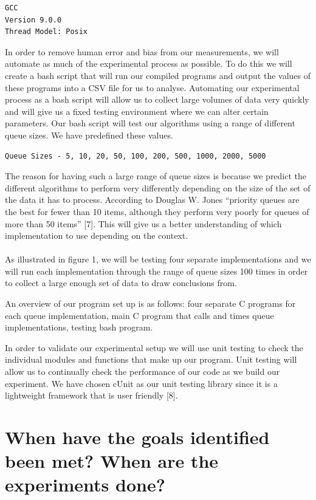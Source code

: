 \documentclass[12pt]{article}
\begin{document}
\begin{verbatim}
GCC
Version 9.0.0
Thread Model: Posix
\end{verbatim}

In order to remove human error and bias from our measurements, we will automate as much of the experimental process as possible. To do this we will create a bash script that will run our compiled programs and output the values of  these programs into a CSV file for us to analyse. Automating our experimental process as a bash script will allow us to collect large volumes of data very quickly and will give us a fixed testing environment where we can alter certain parameters. Our bash script will test our algorithms using a range of different queue sizes. We have predefined these values.

\begin{verbatim}
Queue Sizes - 5, 10, 20, 50, 100, 200, 500, 1000, 2000, 5000
\end{verbatim}

The reason for having such a large range of queue sizes is because we predict the different algorithms to perform very differently depending on the size of the set of the data it has to process. According to Douglas W. Jones “priority queues are the best for fewer than 10 items, although they perform very poorly for queues of more than 50 items” [7]. This will give us a better understanding of which implementation to use depending on the context.
\\
\\
As illustrated in figure 1, we will be testing four separate implementations and we will run each implementation through the range of queue sizes 100 times in order to collect a large enough set of data to draw conclusions from. 

An overview of our program set up is as follows:  four separate C programs for each queue implementation, main C program that calls and times queue implementations, testing bash program.

In order to validate our experimental setup we will use unit testing to check the individual modules and functions that make up our program. Unit testing will allow us to continually check the performance of our code as we build our experiment. We have chosen cUnit as our unit testing library since it is a lightweight framework that is user friendly [8].


\section{When have the goals identified been met? When are the experiments done?}
\end{document}
